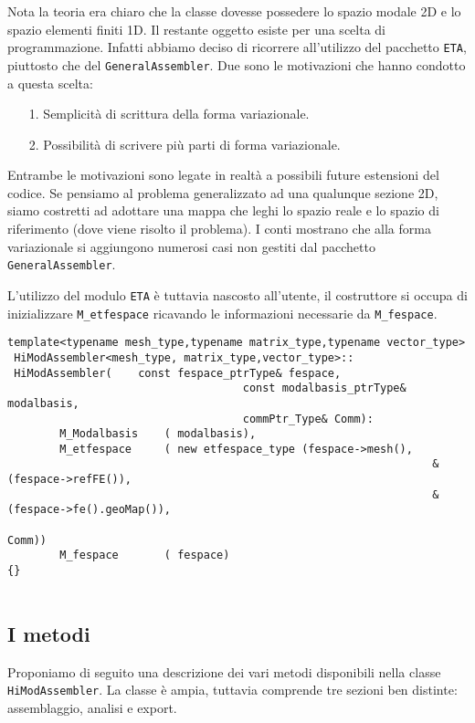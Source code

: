 
Nota la teoria era chiaro che la classe dovesse possedere lo spazio modale 2D e lo spazio elementi finiti 1D.
Il restante oggetto esiste per una scelta di programmazione. Infatti abbiamo deciso di ricorrere all'utilizzo del pacchetto \texttt{ETA}, piuttosto che del \texttt{GeneralAssembler}. Due sono le motivazioni che hanno condotto a questa scelta:
\begin{itemize}
\item[1.] Semplicit\`a di scrittura della forma variazionale.
\item[2.] Possibilit\`a di scrivere pi\`u parti di forma variazionale.
\end{itemize}

Entrambe le motivazioni sono legate in realt\`a a possibili future estensioni del codice. Se pensiamo al problema generalizzato ad una qualunque sezione 2D, siamo costretti ad adottare una mappa che leghi lo spazio reale e lo spazio di riferimento (dove viene risolto il problema). I conti mostrano che alla forma variazionale si aggiungono numerosi casi non gestiti dal pacchetto \texttt{GeneralAssembler}.

L'utilizzo del modulo \texttt{ETA} \`e tuttavia nascosto all'utente, il costruttore si occupa di inizializzare \texttt{M\_etfespace} ricavando le informazioni necessarie da \texttt{M\_fespace}.

\begin{lstlisting}[style=general]
 template<typename mesh_type,typename matrix_type,typename vector_type>
 HiModAssembler<mesh_type, matrix_type,vector_type>::
 HiModAssembler(	const fespace_ptrType& fespace,
 									const modalbasis_ptrType& modalbasis,
 									commPtr_Type& Comm):
 		M_Modalbasis	( modalbasis),
 		M_etfespace 	( new etfespace_type (fespace->mesh(),
 																 &(fespace->refFE()),
 																 &(fespace->fe().geoMap()),
 																 Comm))
		M_fespace		( fespace)
{} 																 
 																
\end{lstlisting}

\subsection{I metodi}
Proponiamo di seguito una descrizione dei vari metodi disponibili nella classe \texttt{HiModAssembler}. La classe \`e ampia, tuttavia comprende tre sezioni ben distinte: assemblaggio, analisi e export.
